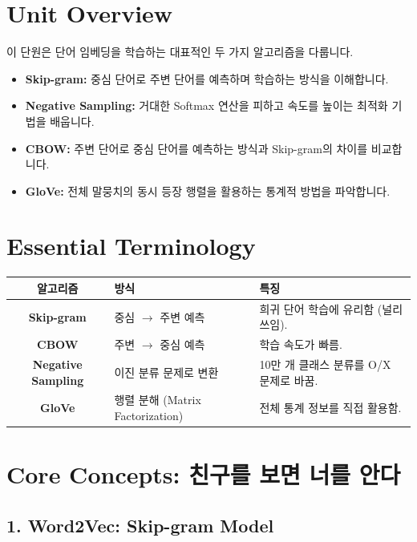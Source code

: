 \documentclass[11pt,a4paper]{book}
\theoremstyle{definition}
\begin{document}
\section{Unit Overview}
\begin{summarybox}[title={핵심 목표}]
이 단원은 단어 임베딩을 학습하는 대표적인 두 가지 알고리즘을 다룹니다.
\begin{itemize}
    \item \textbf{Skip-gram:} 중심 단어로 주변 단어를 예측하며 학습하는 방식을 이해합니다.
    \item \textbf{Negative Sampling:} 거대한 Softmax 연산을 피하고 속도를 높이는 최적화 기법을 배웁니다.
    \item \textbf{CBOW:} 주변 단어로 중심 단어를 예측하는 방식과 Skip-gram의 차이를 비교합니다.
    \item \textbf{GloVe:} 전체 말뭉치의 동시 등장 행렬을 활용하는 통계적 방법을 파악합니다.
\end{itemize}
\end{summarybox}

\section{Essential Terminology}
\begin{center}
\begin{tabular}{|c|l|l|}
\hline
\textbf{알고리즘} & \textbf{방식} & \textbf{특징} \\ \hline
\textbf{Skip-gram} & 중심 $\rightarrow$ 주변 예측 & 희귀 단어 학습에 유리함 (널리 쓰임). \\ \hline
\textbf{CBOW} & 주변 $\rightarrow$ 중심 예측 & 학습 속도가 빠름. \\ \hline
\textbf{Negative Sampling} & 이진 분류 문제로 변환 & 10만 개 클래스 분류를 O/X 문제로 바꿈. \\ \hline
\textbf{GloVe} & 행렬 분해 (Matrix Factorization) & 전체 통계 정보를 직접 활용함. \\ \hline
\end{tabular}
\end{center}

\section{Core Concepts: 친구를 보면 너를 안다}

\subsection{1. Word2Vec: Skip-gram Model}
\end{document}
